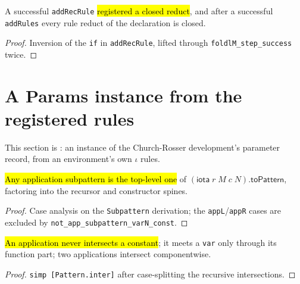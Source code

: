 \begin{lemma}
\label{family:indlem-closed}
\leanok
{} 

 A successful \texttt{addRecRule} \hl{registered a closed reduct}, and after
a successful \texttt{addRules} every rule reduct of the declaration is closed.
\end{lemma}
\begin{proof}
\leanok
{} Inversion of the \texttt{if} in \texttt{addRecRule}, lifted through
\texttt{foldlM\_step\_success} twice.
\end{proof}

\section{A Params instance from the registered rules}

This section is : an instance of the
Church-Rosser development's parameter record, from an environment's own $\iota$ rules.

\begin{lemma}
\label{family:indparams-iota-subpattern}
\leanok
{} 

 \hl{Any application subpattern is the top-level one} of
$(\mathsf{iota}\;r\;M\;c\;N).\mathsf{toPattern}$, factoring into the recursor and constructor
spines.
\end{lemma}
\begin{proof}
\leanok
{} Case analysis on the \texttt{Subpattern} derivation; the \texttt{appL}/\texttt{appR}
cases are excluded by \texttt{not\_app\_subpattern\_varN\_const}.
\end{proof}

\begin{lemma}
\label{family:indparams-inter}
\leanok
{} 

 \hl{An application never intersects a constant}; it meets a \texttt{var}
only through its function part; two applications intersect componentwise.
\end{lemma}
\begin{proof}
\leanok
{} \texttt{simp [Pattern.inter]} after case-splitting the recursive intersections.
\end{proof}

